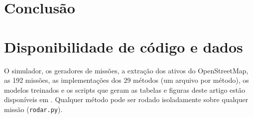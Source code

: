 \section{Conclusão}\label{sec:conclusao}
\todo{}

\section*{Disponibilidade de código e dados}
O simulador, os geradores de missões, a extração dos ativos do OpenStreetMap, as 192 missões, as implementações dos 29
métodos (um arquivo por método), os modelos treinados e os scripts que geram as tabelas e figuras deste artigo estão
disponíveis em . Qualquer método pode ser rodado isoladamente sobre qualquer missão
(\texttt{rodar.py}).

